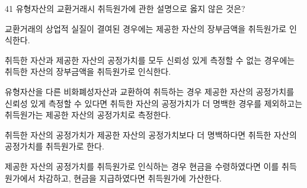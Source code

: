 \begin{question}{41}
유형자산의 교환거래시 취득원가에 관한 설명으로 옳지 않은 것은?
\begin{choices}
  \item 교환거래의 상업적 실질이 결여된 경우에는 제공한 자산의 장부금액을 취득원가로 인식한다.
  \item 취득한 자산과 제공한 자산의 공정가치를 모두 신뢰성 있게 측정할 수 없는 경우에는 취득한 자산의 장부금액을 취득원가로 인식한다.
  \item 유형자산을 다른 비화폐성자산과 교환하여 취득하는 경우 제공한 자산의 공정가치를 신뢰성 있게 측정할 수 있다면 취득한 자산의 공정가치가 더 명백한 경우를 제외하고는 취득원가는 제공한 자산의 공정가치로 측정한다.
  \item 취득한 자산의 공정가치가 제공한 자산의 공정가치보다 더 명백하다면 취득한 자산의 공정가치를 취득원가로 한다.
  \item 제공한 자산의 공정가치를 취득원가로 인식하는 경우 현금을 수령하였다면 이를 취득원가에서 차감하고, 현금을 지급하였다면 취득원가에 가산한다.
\end{choices}
\end{question}
